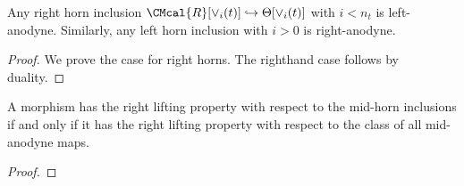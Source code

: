 \begin{lemma} Any right horn inclusion \(\CMcal{R}[\vee_{i}(t)]\hookrightarrow \Theta[\vee_i(t)]\) with \(i<n_t\) is left-anodyne.  Similarly, any left horn inclusion with \(i>0\) is right-anodyne.  
\end{lemma}
\begin{proof}We prove the case for right horns.  The righthand case follows by duality.  


\end{proof}

\begin{thm} A morphism has the right lifting property with respect to the mid-horn inclusions if and only if it has the right lifting property with respect to the class of all mid-anodyne maps.  
\end{thm}
\begin{proof}
\end{proof}